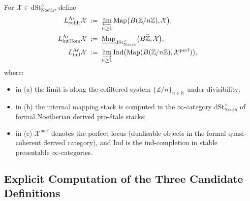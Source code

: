 \begin{definition}
\label{v4-arith:bzn-rcompletion:def:three-candidates}
For \(\mathcal{X}\in\mathrm{dSt}^{\wedge}_{\mathrm{Noeth}}\), define
\begin{align}
L^{\mathrm{Ar}}_{\mathrm{cofilt}}\mathcal{X}
&\;:=\;\varprojlim_{n\geq 1}\mathrm{Map}\bigl(B(\mathbb{Z}/n\mathbb{Z}),\mathcal{X}\bigr),\\
L^{\mathrm{Ar}}_{\mathrm{intHom}}\mathcal{X}
&\;:=\;\underline{\mathrm{Map}}_{\mathrm{dSt}^{\wedge}_{\mathrm{Noeth}}}\bigl(B\widehat{\mathbb{Z}},\mathcal{X}\bigr),\\
L^{\mathrm{Ar}}_{\mathrm{ind}}\mathcal{X}
&\;:=\;\varinjlim_{n\geq 1}\mathrm{Ind}\bigl(\mathrm{Map}(B(\mathbb{Z}/n\mathbb{Z}),\mathcal{X}^{\mathrm{perf}})\bigr),
\end{align}
where:
\begin{itemize}
\item in (a) the limit is along the cofiltered system
\(\{\mathbb{Z}/n\}_{n\in\mathbb{N}}\) under divisibility;
\item in (b) the internal mapping stack is computed in the
\(\infty\)-category \(\mathrm{dSt}^{\wedge}_{\mathrm{Noeth}}\) of
formal Noetherian derived pro-\'etale stacks;
\item in (c) \(\mathcal{X}^{\mathrm{perf}}\) denotes the perfect
locus (dualisable objects in the formal quasi-coherent
derived category), and \(\mathrm{Ind}\) is the ind-completion in
stable presentable \(\infty\)-categories.
\end{itemize}
\end{definition}

\subsection{Explicit Computation of the Three Candidate Definitions}

